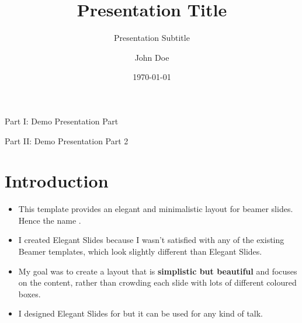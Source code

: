 \documentclass[
11pt,notheorems,hyperref={pdfauthor=whatever}
]{beamer}
\title[
]{Presentation Title}
\subtitle{Presentation Subtitle}
\author[
]{
    John Doe 
}
\institute{
    Author Affiliation, \\
    University of Author}
\date{\today}
\begin{document}
{
\begin{frame}
  \titlepage
\end{frame}
}
\addtocounter{framenumber}{-1}

\begin{frame}{Part I: Demo Presentation Part}
    \tableofcontents[part=1]
\end{frame}
\begin{frame}{Part II: Demo Presentation Part 2}
    \tableofcontents[part=2]
\end{frame}


\section{Introduction}
\begin{frame}
\begin{itemize}
    \item This template provides an elegant and minimalistic layout for beamer slides. Hence the name .
    \item I created Elegant Slides because I wasn't satisfied with any of the existing Beamer templates, which look slightly different than Elegant Slides.
    \item My goal was to create a layout that is \alert{\textbf{simplistic but beautiful}} and focuses on the content, rather than crowding each slide with lots of different coloured boxes.
    \item I designed Elegant Slides for  but it can be used for any kind of talk. 
\end{itemize}
\end{frame}
\end{document}
